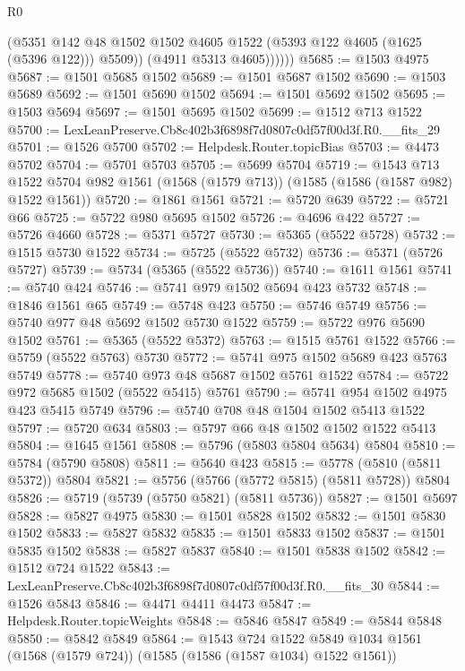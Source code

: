 \begin{lexlean}{R0}
\begin{coremodule}
                (@5351
                  @142
                  @48
                  @1502
                  @1502
                  @4605
                  @1522
                  (@5393 @122 @4605 (@1625 (@5396 @122)))
                  @5509))
              (@4911 @5313 @4605))))))
@5685 := @1503 @4975
@5687 := @1501 @5685 @1502
@5689 := @1501 @5687 @1502
@5690 := @1503 @5689
@5692 := @1501 @5690 @1502
@5694 := @1501 @5692 @1502
@5695 := @1503 @5694
@5697 := @1501 @5695 @1502
@5699 := @1512 @713 @1522
@5700 := LexLeanPreserve.Cb8c402b3f6898f7d0807c0df57f00d3f.R0.__fits_29
@5701 := @1526 @5700
@5702 := Helpdesk.Router.topicBias
@5703 := @4473 @5702
@5704 := @5701 @5703
@5705 := @5699 @5704
@5719 := @1543
    @713
    @1522
    @5704
    @982
    @1561
    (@1568 (@1579 @713))
    (@1585 (@1586 (@1587 @982) @1522 @1561))
@5720 := @1861 @1561
@5721 := @5720 @639
@5722 := @5721 @66
@5725 := @5722 @980 @5695 @1502
@5726 := @4696 @422
@5727 := @5726 @4660
@5728 := @5371 @5727
@5730 := @5365 (@5522 @5728)
@5732 := @1515 @5730 @1522
@5734 := @5725 (@5522 @5732)
@5736 := @5371 (@5726 @5727)
@5739 := @5734 (@5365 (@5522 @5736))
@5740 := @1611 @1561
@5741 := @5740 @424
@5746 := @5741 @979 @1502 @5694 @423 @5732
@5748 := @1846 @1561 @65
@5749 := @5748 @423
@5750 := @5746 @5749
@5756 := @5740 @977 @48 @5692 @1502 @5730 @1522
@5759 := @5722 @976 @5690 @1502
@5761 := @5365 (@5522 @5372)
@5763 := @1515 @5761 @1522
@5766 := @5759 (@5522 @5763) @5730
@5772 := @5741 @975 @1502 @5689 @423 @5763 @5749
@5778 := @5740 @973 @48 @5687 @1502 @5761 @1522
@5784 := @5722 @972 @5685 @1502 (@5522 @5415) @5761
@5790 := @5741 @954 @1502 @4975 @423 @5415 @5749
@5796 := @5740 @708 @48 @1504 @1502 @5413 @1522
@5797 := @5720 @634
@5803 := @5797 @66 @48 @1502 @1502 @1522 @5413
@5804 := @1645 @1561
@5808 := @5796 (@5803 @5804 @5634) @5804
@5810 := @5784 (@5790 @5808)
@5811 := @5640 @423
@5815 := @5778 (@5810 (@5811 @5372)) @5804
@5821 := @5756 (@5766 (@5772 @5815) (@5811 @5728)) @5804
@5826 := @5719 (@5739 (@5750 @5821) (@5811 @5736))
@5827 := @1501 @5697
@5828 := @5827 @4975
@5830 := @1501 @5828 @1502
@5832 := @1501 @5830 @1502
@5833 := @5827 @5832
@5835 := @1501 @5833 @1502
@5837 := @1501 @5835 @1502
@5838 := @5827 @5837
@5840 := @1501 @5838 @1502
@5842 := @1512 @724 @1522
@5843 := LexLeanPreserve.Cb8c402b3f6898f7d0807c0df57f00d3f.R0.__fits_30
@5844 := @1526 @5843
@5846 := @4471 @4411 @4473
@5847 := Helpdesk.Router.topicWeights
@5848 := @5846 @5847
@5849 := @5844 @5848
@5850 := @5842 @5849
@5864 := @1543
    @724
    @1522
    @5849
    @1034
    @1561
    (@1568 (@1579 @724))
    (@1585 (@1586 (@1587 @1034) @1522 @1561))

\end{coremodule}
\end{lexlean}

